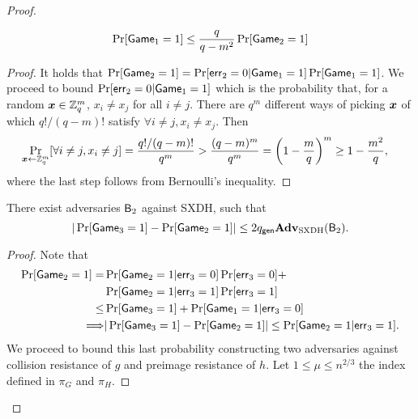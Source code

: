 \begin{proof}
\begin{lemma} 
$$
\Pr[\mathsf{Game}_1=1]\leq \frac{q}{q-m^2}\Pr[\mathsf{Game}_2=1]
$$
\end{lemma}
\begin{proof}
It holds that $\Pr[\mathsf{Game}_2=1] = \Pr[\mathsf{err}_2=0|\mathsf{Game}_1=1]\Pr[\mathsf{Game}_1=1]$. We proceed to bound $\Pr[\mathsf{err}_2=0|\mathsf{Game}_1=1]$ which is the probability that, for a random ${\boldsymbol{x}}\in\mathbb{Z}_q^m$, $x_i\neq x_j$ for all $i\neq j$.
There are $q^m$ different ways of picking ${\boldsymbol{x}}$ of which $q!/(q-m)!$ satisfy $\forall i\neq j, x_i\neq x_j$. Then
\begin{align*}
\Pr_{{\boldsymbol{x}}\gets\mathbb{Z}_q^m}[\forall i\neq j, x_i\neq j] & = \frac{q!/(q-m)!}{q^m} > \frac{(q-m)^m}{q^m} = \left(1-\frac{m}{q}\right)^m \geq 1-\frac{m^2}{q},
\end{align*}
where the last step follows from Bernoulli's inequality.
\end{proof}
\begin{lemma} There exist adversaries $\mathsf{B}_2$ against SXDH, such that
$$
|\Pr[\mathsf{Game}_3=1]-\Pr[\mathsf{Game}_2=1]|\leq 2q_\mathsf{gen}\mathbf{Adv}_\mathrm{SXDH}(\mathsf{B}_2).
$$\label{lemma:fin}
\end{lemma}
\begin{proof}
Note that
\begin{align*}
\Pr[\mathsf{Game}_2=1]
 = &\Pr[\mathsf{Game}_2=1|\mathsf{err}_3=0]\Pr[\mathsf{err}_3=0]+\\
&\Pr[\mathsf{Game}_2=1|\mathsf{err}_3=1]\Pr[\mathsf{err}_3=1]\\
 \leq& \Pr[\mathsf{Game}_3=1] + \Pr[\mathsf{Game}_1=1|\mathsf{err}_3=0]\\
\Longrightarrow  &|\Pr[\mathsf{Game}_3=1]-\Pr[\mathsf{Game}_2=1]|\leq \Pr[\mathsf{Game}_2=1|\mathsf{err}_3=1].
\end{align*}
We proceed to bound this last probability constructing two adversaries against collision resistance of $g$ and preimage resistance of $h$. Let $1\leq \mu\leq n^{2/3}$ the index defined in $\pi_G$ and $\pi_H$.



\end{proof}
\end{proof}
